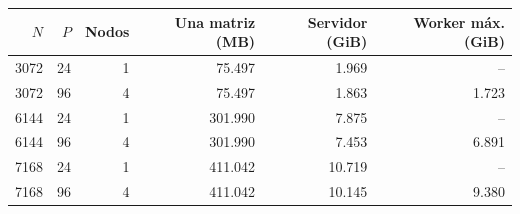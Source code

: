 \begin{center}\small
\begin{tabular}{rrrrrr}
\toprule
$N$ & $P$ & Nodos & Una matriz (MB) & Servidor (GiB) & Worker máx. (GiB) \\
\midrule
3072 & 24 & 1 & 75.497 & 1.969 & -- \\
3072 & 96 & 4 & 75.497 & 1.863 & 1.723 \\
6144 & 24 & 1 & 301.990 & 7.875 & -- \\
6144 & 96 & 4 & 301.990 & 7.453 & 6.891 \\
7168 & 24 & 1 & 411.042 & 10.719 & -- \\
7168 & 96 & 4 & 411.042 & 10.145 & 9.380 \\
\bottomrule
\end{tabular}
\end{center}
